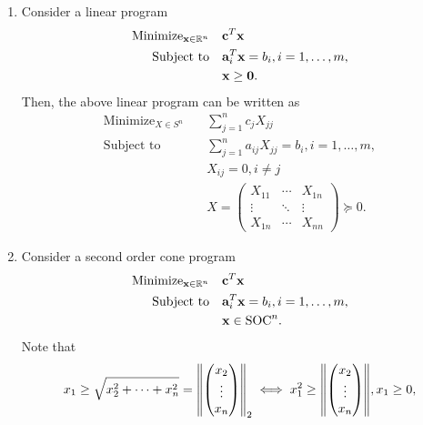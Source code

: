 \begin{enumerate}[label=(\arabic*)]
    \item Consider a linear program
          \begin{align*}
              \text{Minimize}_{\mathbf{x} \in \mathbb{R}^n} \quad & \mathbf{c}^T \mathbf{x}                           \\
              \text{Subject to} \quad               & \mathbf{a}_i^T \mathbf{x} = b_i, i = 1, \dots, m, \\
                                                    & \mathbf{x} \geq \mathbf{0}.
          \end{align*}
          Then, the above linear program can be written as
          \begin{align*}
              \text{Minimize}_{X \in S^n} \quad & \sum_{j = 1}^n c_j X_{jj}                           \\
              \text{Subject to} \quad           & \sum_{j = 1}^n a_{ij}X_{jj} = b_i, i = 1, \dots, m, \\
                                                & X_{ij} = 0, i \neq j                                \\
                                                & X = \begin{pmatrix}
                  X_{11} & \cdots & X_{1n} \\
                  \vdots & \ddots & \vdots \\
                  X_{1n} & \cdots & X_{nn}
              \end{pmatrix} \succeq 0.
          \end{align*}
    \item Consider a second order cone program
          \begin{align*}
              \text{Minimize}_{\mathbf{x} \in \mathbb{R}^n} \quad & \mathbf{c}^T \mathbf{x}                           \\
              \text{Subject to} \quad               & \mathbf{a}_i^T \mathbf{x} = b_i, i = 1, \dots, m, \\
                                                    & \mathbf{x}\in \text{SOC}^n.
          \end{align*}
          Note that
          \begin{align*}
              x_1 \geq \sqrt{x_2^2 + \dots + x_n^2} = \norm{\begin{pmatrix} x_2 \\ \vdots \\ x_n\end{pmatrix}}_2 & \iff x_1^2 \geq \norm{\begin{pmatrix} x_2 \\ \vdots \\ x_n \end{pmatrix}}, x_1 \geq 0, \\

\end{align*}
\end{enumerate}
